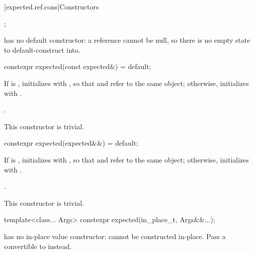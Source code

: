 [expected.ref.cons]{Constructors}

%
\begin{itemdecl}
;
\end{itemdecl}

\begin{itemdescr}
\pnum
\remarks
{} has no default constructor: a reference cannot be null, so there is no empty state to default-construct into.
\end{itemdescr}

%
\begin{itemdecl}
constexpr expected(const expected&) = default;
\end{itemdecl}

\begin{itemdescr}
\pnum
\effects
If  is , initializes  with , so that  and  refer to the same object; otherwise, initializes  with .

\pnum
\ensures
{}.

\pnum
\remarks
This constructor is trivial.
\end{itemdescr}

%
\begin{itemdecl}
constexpr expected(expected&&) = default;
\end{itemdecl}

\begin{itemdescr}
\pnum
\effects
If  is , initializes  with , so that  and  refer to the same object; otherwise, initializes  with .

\pnum
\ensures
{}.

\pnum
\remarks
This constructor is trivial.
\end{itemdescr}

%
\begin{itemdecl}
template<class... Args> constexpr expected(in_place_t, Args&&...);
\end{itemdecl}

\begin{itemdescr}
\pnum
\remarks
{} has no in-place value constructor:  cannot be constructed in-place. Pass a  convertible to  instead.
\end{itemdescr}

